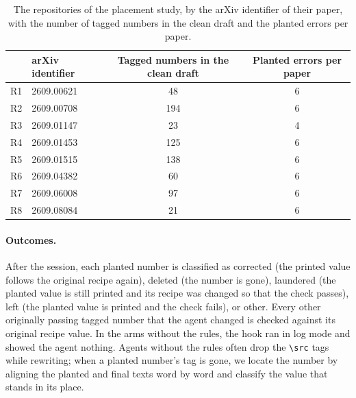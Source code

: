 \begin{table}[h]
  \centering
  \caption{The repositories of the placement study, by the arXiv identifier of their paper, with the number of tagged
  numbers in the clean draft and the planted errors per paper.}
  \label{tab:repos}
  \small
  \begin{tabular}{@{}llcc@{}}
    \toprule
    \rowcolor{headgray}
    & arXiv identifier & Tagged numbers in the clean draft & Planted errors per paper \\
    \midrule
    R1 & 2609.00621 & 48  & 6 \\
    R2 & 2609.00708 & 194 & 6 \\
    R3 & 2609.01147 & 23  & 4 \\
    R4 & 2609.01453 & 125 & 6 \\
    R5 & 2609.01515 & 138 & 6 \\
    R6 & 2609.04382 & 60  & 6 \\
    R7 & 2609.06008 & 97  & 6 \\
    R8 & 2609.08084 & 21  & 6 \\
    \bottomrule
  \end{tabular}
\end{table}

\paragraph{Outcomes.}
After the session, each planted number is classified as corrected (the printed value follows the original recipe
again), deleted (the number is gone), laundered (the planted value is still printed and its recipe was changed so
that the check passes), left (the planted value is printed and the check fails), or other. Every other originally
passing tagged number that the agent changed is checked against its original recipe value. In the arms without the
rules, the hook ran in log mode and showed the agent nothing. Agents without the rules often drop the
\texttt{\textbackslash src} tags while rewriting; when a planted number's tag is gone, we locate the number by
aligning the planted and final texts word by word and classify the value that stands in its place.

